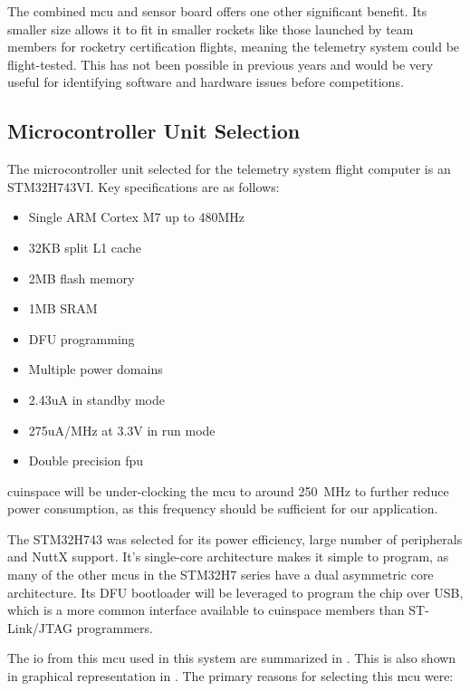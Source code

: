 The combined \gls{mcu} and sensor board offers one other significant benefit. Its smaller size allows it to fit in
smaller rockets like those launched by team members for rocketry certification flights, meaning the telemetry system
could be flight-tested. This has not been possible in previous years and would be very useful for identifying software
and hardware issues before competitions.

\subsection{Microcontroller Unit Selection}

The microcontroller unit selected for the telemetry system flight computer is an STM32H743VI. Key specifications are as
follows:

\begin{itemize}
    \item Single ARM Cortex M7 up to 480MHz \cite[1]{stm32h743vi}
    \item 32KB split L1 cache \cite[1]{stm32h743vi}
    \item 2MB flash memory \cite[1]{stm32h743vi}
    \item 1MB SRAM \cite[1]{stm32h743vi}
    \item DFU programming \cite[Sec. 3.4]{stm32h743vi}
    \item Multiple power domains \cite[1]{stm32h743vi}
    \item 2.43uA in standby mode \cite[1]{stm32h743vi}
    \item 275uA/MHz at 3.3V in run mode \cite[1]{stm32h743vi}
    \item Double precision \gls{fpu} \cite[1]{stm32h743vi}
\end{itemize}

\Gls{cuinspace} will be under-clocking the \gls{mcu} to around \qty{250}{\mega\hertz} to further reduce power consumption, as this frequency should be sufficient for our application.

The STM32H743 was selected for its power efficiency, large number of peripherals and NuttX support. It's single-core
architecture makes it simple to program, as many of the other \glspl{mcu} in the STM32H7 series have a dual asymmetric
core architecture. Its DFU bootloader will be leveraged to program the chip over USB, which is a more common interface
available to \gls{cuinspace} members than ST-Link/JTAG programmers.

The \gls{io} from this \gls{mcu} used in this system are summarized in . This is also shown in
graphical representation in . The primary reasons for selecting this \gls{mcu} were:


